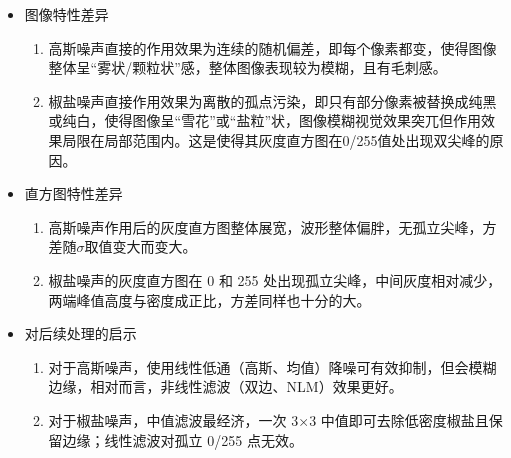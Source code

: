\documentclass[11pt]{article}
\begin{document}
\begin{itemize}
	\item 图像特性差异
	\begin{enumerate}
		\item 高斯噪声直接的作用效果为连续的随机偏差，即每个像素都变，使得图像整体呈“雾状/颗粒状”感，整体图像表现较为模糊，且有毛刺感。
		\item 椒盐噪声直接作用效果为离散的孤点污染，即只有部分像素被替换成纯黑或纯白，使得图像呈“雪花”或“盐粒”状，图像模糊视觉效果突兀但作用效果局限在局部范围内。这是使得其灰度直方图在0/255值处出现双尖峰的原因。
	\end{enumerate}
	\item 直方图特性差异
	\begin{enumerate}
		\item 高斯噪声作用后的灰度直方图整体展宽，波形整体偏胖，无孤立尖峰，方差随$\sigma$取值变大而变大。
		\item 椒盐噪声的灰度直方图在 0 和 255 处出现孤立尖峰，中间灰度相对减少，两端峰值高度与密度成正比，方差同样也十分的大。
	\end{enumerate}
	\item 对后续处理的启示
	\begin{enumerate}
		\item 对于高斯噪声，使用线性低通（高斯、均值）降噪可有效抑制，但会模糊边缘，相对而言，非线性滤波（双边、NLM）效果更好。
		\item 对于椒盐噪声，中值滤波最经济，一次 3×3 中值即可去除低密度椒盐且保留边缘；线性滤波对孤立 0/255 点无效。
	\end{enumerate}
\end{itemize}

    \begin{center}
    \end{center}
  
  
\end{document}

